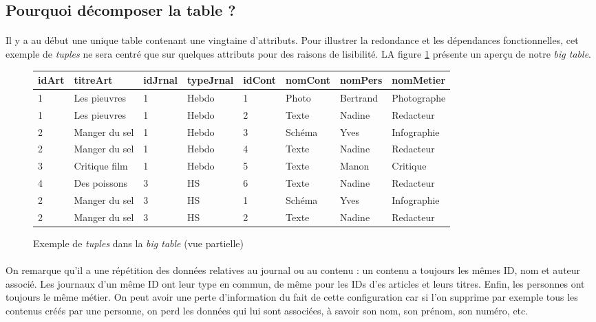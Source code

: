 \subsection{Pourquoi décomposer la table ?}
\paragraph{}{Il y a au début une unique table contenant une vingtaine d'attributs. Pour illustrer la redondance et les dépendances fonctionnelles, cet exemple de \textit{tuples} ne sera centré que sur quelques attributs pour des raisons de lisibilité. LA figure \ref{bigtableex} présente un aperçu de notre \textit{big table}.}

\begin{figure}
\label{bigtableex}
    {
	\centering
    \begin{tabular}{|l|l|l|l|l|l|l|l|}
        \hline idArt & titreArt & idJrnal & typeJrnal & idCont & nomCont & nomPers & nomMetier \\ 
        \hline 1 & Les pieuvres & 1 & Hebdo & 1 & Photo & Bertrand & Photographe \\ 
        \hline 1 & Les pieuvres & 1 & Hebdo & 2 &Texte & Nadine & Redacteur \\ 
        \hline 2 & Manger du sel & 1 & Hebdo & 3 & Schéma & Yves & Infographie \\ 
        \hline 2 & Manger du sel & 1 & Hebdo & 4 & Texte & Nadine & Redacteur \\ 
        \hline 3 & Critique film & 1 & Hebdo & 5 & Texte & Manon & Critique \\ 
        \hline 4 & Des poissons & 3 & HS & 6 & Texte & Nadine & Redacteur \\ 
        \hline 2 & Manger du sel & 3 & HS & 1 & Schéma & Yves & Infographie \\ 
        \hline 2 & Manger du sel & 3 & HS & 2 & Texte & Nadine & Redacteur \\ 
        \hline 
    \end{tabular}
    }
\caption{Exemple de \textit{tuples} dans la \textit{big table} (vue partielle)}
\end{figure} 

\paragraph{}{On remarque qu'il a une répétition des données relatives au journal ou au contenu : un contenu a toujours les mêmes ID, nom et auteur associé. Les journaux d'un même ID ont leur type en commun, de même pour les IDs d'es articles et leurs titres. Enfin, les personnes ont toujours le même métier. On peut avoir une perte d'information du fait de cette configuration car si l'on supprime par exemple tous les contenus créés par une personne, on perd les données qui lui sont associées, à savoir son nom, son prénom, son numéro, etc.}

